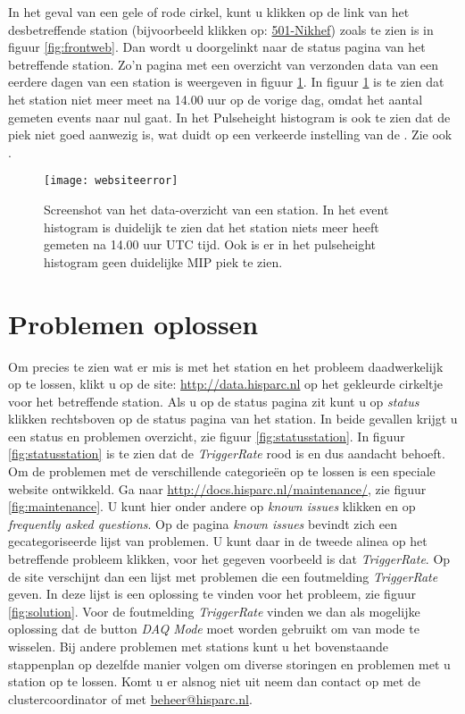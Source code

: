 In het geval van een gele of rode cirkel, kunt u klikken op de link van
het desbetreffende station (bijvoorbeeld klikken op:
\underline{501-Nikhef}) zoals te zien is in figuur \ref{fig:frontweb}.
Dan wordt u doorgelinkt naar de status pagina van het betreffende
station. Zo'n pagina met een overzicht van verzonden data van een
eerdere dagen van een station is weergeven in figuur
\ref{fig:websiteerror}. In figuur \ref{fig:websiteerror} is te zien dat
het station niet meer meet na 14.00 uur op de vorige dag,  omdat het
aantal gemeten events naar nul gaat. In het Pulseheight histogram is ook
te zien dat de \mip piek niet goed aanwezig is, wat duidt op een
verkeerde instelling van de \pmt. Zie ook \cite{inregelen}.

\begin{figure} 
    \centering 
    \texttt{[image: websiteerror]}
    \caption{Screenshot van het data-overzicht van een
             station. In het event histogram is duidelijk te zien dat
             het station niets meer heeft gemeten na 14.00 uur UTC tijd.
             Ook is er in het pulseheight histogram geen duidelijke MIP
             piek te zien.}
    \label{fig:websiteerror} 
\end{figure}

\section{Problemen oplossen}

Om precies te zien wat er mis is met het station en het probleem
daadwerkelijk op te lossen, klikt u op de site:
\url{http://data.hisparc.nl} op het gekleurde cirkeltje voor het
betreffende station. Als u op de status pagina zit kunt u op
\emph{status} klikken rechtsboven op de status pagina van het station.
In beide gevallen krijgt u een status en problemen overzicht, zie figuur
\ref{fig:statusstation}. In figuur \ref{fig:statusstation} is te zien
dat de \emph{TriggerRate} rood is en dus aandacht behoeft. Om de
problemen met de verschillende categorieën op te lossen is een speciale
website ontwikkeld. Ga naar \url{http://docs.hisparc.nl/maintenance/},
zie figuur \ref{fig:maintenance}. U kunt hier onder andere op
\emph{known issues} klikken en op \emph{frequently asked questions}. Op
de pagina \emph{known issues} bevindt zich een gecategoriseerde lijst
van problemen. U kunt daar in de tweede alinea op het betreffende
probleem klikken, voor het gegeven voorbeeld is dat \emph{TriggerRate}.
Op de site verschijnt dan een lijst met problemen die een foutmelding
\emph{TriggerRate} geven. In deze lijst is een oplossing te vinden voor
het probleem, zie figuur \ref{fig:solution}. Voor de foutmelding
\emph{TriggerRate} vinden we dan als mogelijke oplossing dat de button
\emph{DAQ Mode} moet worden gebruikt om van mode te wisselen. Bij andere
problemen met stations kunt u het bovenstaande stappenplan op dezelfde
manier volgen om diverse storingen en problemen met u station op te
lossen. Komt u er alsnog niet uit neem dan contact op met de
clustercoordinator of met \url{beheer@hisparc.nl}.
 


